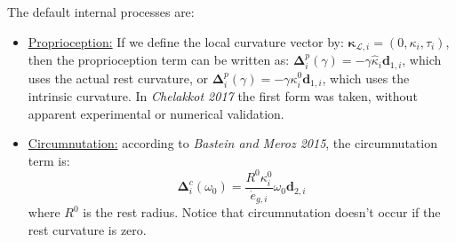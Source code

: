 \documentclass[a4paper, 11pt]{article}
\begin{document}
The default internal processes are:
\begin{itemize}
    \item \underline{Proprioception:} If we define the local curvature vector by: $\boldsymbol{\kappa}_{\mathcal{L},i}=(0,\kappa_i,\tau_i)$, then the proprioception term can be written as: $\boldsymbol{\Delta}^p_i(\gamma)=-\gamma\hat{\kappa}_i\boldsymbol{d}_{1,i}$, which uses the actual rest curvature, or $\boldsymbol{\Delta}^p_i(\gamma)=-\gamma\kappa^0_i\boldsymbol{d}_{1,i}$, which uses the intrinsic curvature. In \emph{Chelakkot 2017} the first form was taken, without apparent experimental or numerical validation.
    
    \item \underline{Circumnutation:} according to \emph{Bastein and Meroz 2015}, the circumnutation term is:
    \begin{equation}
    \boldsymbol{\Delta}^{c}_i(\omega_0)=\frac{R^0\kappa^0_i}{\dot{e}_{g,i}}\omega_0\boldsymbol{d}_{2,i}    
    \end{equation}
    where $R^0$ is the rest radius. Notice that circumnutation doesn't occur if the rest curvature is zero.
\end{itemize}
\end{document}
